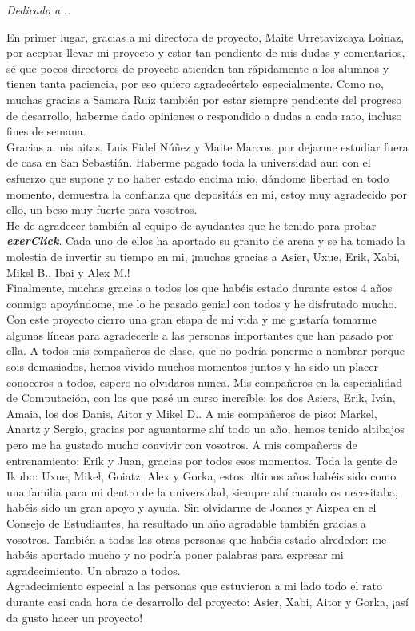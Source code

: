 \begin{flushright}
	\Large\textit{Dedicado a...}
\end{flushright}

En primer lugar, gracias a mi directora de proyecto, Maite Urretavizcaya Loinaz, por aceptar llevar mi proyecto y estar tan pendiente de mis dudas y comentarios, sé que pocos directores de proyecto atienden tan rápidamente a los alumnos y tienen tanta paciencia, por eso quiero agradecértelo especialmente. Como no, muchas gracias a Samara Ruíz también por estar siempre pendiente del progreso de desarrollo, haberme dado opiniones o respondido a dudas a cada rato, incluso fines de semana.\\

Gracias a mis aitas, Luis Fidel Núñez y Maite Marcos, por dejarme estudiar fuera de casa en San Sebastián. Haberme pagado toda la universidad aun con el esfuerzo que supone y no haber estado encima mio, dándome libertad en todo momento, demuestra la confianza que depositáis en mi, estoy muy agradecido por ello, un beso muy fuerte para vosotros.\\

He de agradecer también al equipo de ayudantes que he tenido para probar \textit{\textbf{exerClick}}. Cada uno de ellos ha aportado su granito de arena y se ha tomado la molestia de invertir su tiempo en mi, ¡muchas gracias a Asier, Uxue, Erik, Xabi, Mikel B., Ibai y Alex M.!\\

Finalmente, muchas gracias a todos los que habéis estado durante estos 4 años conmigo apoyándome, me lo he pasado genial con todos y he disfrutado mucho. Con este proyecto cierro una gran etapa de mi vida y me gustaría tomarme algunas líneas para agradecerle a las personas importantes que han pasado por ella. A todos mis compañeros de clase, que no podría ponerme a nombrar porque sois demasiados, hemos vivido muchos momentos juntos y ha sido un placer conoceros a todos, espero no olvidaros nunca. Mis compañeros en la especialidad de Computación, con los que pasé un curso increíble: los dos Asiers, Erik, Iván, Amaia, los dos Danis, Aitor y Mikel D.. A mis compañeros de piso: Markel, Anartz y Sergio, gracias por aguantarme ahí todo un año, hemos tenido altibajos pero me ha gustado mucho convivir con vosotros. A mis compañeros de entrenamiento: Erik y Juan, gracias por todos esos momentos. Toda la gente de Ikubo: Uxue, Mikel, Goiatz, Alex y Gorka, estos ultimos años habéis sido como una familia para mi dentro de la universidad, siempre ahí cuando os necesitaba, habéis sido un gran apoyo y ayuda. Sin olvidarme de Joanes y Aizpea en el Consejo de Estudiantes, ha resultado un año agradable también gracias a vosotros. También a todas las otras personas que habéis estado alrededor: me habéis aportado mucho y no podría poner palabras para expresar mi agradecimiento. Un abrazo a todos.\\

Agradecimiento especial a las personas que estuvieron a mi lado todo el rato durante casi cada hora de desarrollo del proyecto: Asier, Xabi, Aitor y Gorka, ¡así da gusto hacer un proyecto!\\